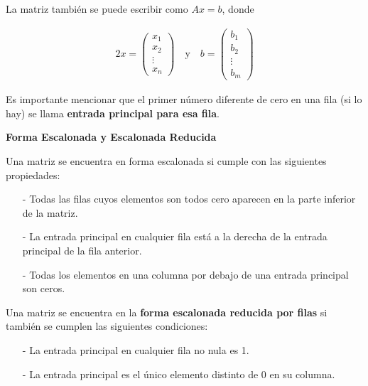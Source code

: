 \documentclass{article}
\begin{document}
\pagebreak

La matriz también se puede escribir como $Ax = b$, donde 

\begin{alignat*}{2}
    x= \begin{pmatrix}
        x_1\\
        x_2\\
        \vdots\\
        x_n
    \end{pmatrix} 
    \quad \text{y} \quad b = 
    \begin{pmatrix}
        b_1\\
        b_2\\
        \vdots\\
        b_m
    \end{pmatrix} 
\end{alignat*}

Es importante mencionar que el primer número diferente de cero en una fila (si lo hay) se llama \textbf{entrada principal para esa fila}. 

\begin{large}
    \textbf{Forma Escalonada y Escalonada Reducida}
\end{large}

Una matriz se encuentra en forma escalonada si cumple con las siguientes propiedades:

\begin{tcolorbox}[colback=blue!10!white,colframe=blue!60!black,title=Propiedades de la Forma Escalonada]
    \begin{itemize}
        \item[-] Todas las filas cuyos elementos son todos cero aparecen en la parte inferior de la matriz.
        \item[-] La entrada principal en cualquier fila está a la derecha de la entrada principal de la fila anterior.
        \item[-] Todas los elementos en una columna por debajo de una entrada principal son ceros.
    \end{itemize}   
    Una matriz se encuentra en la \textbf{forma escalonada reducida por filas} si también se cumplen las siguientes condiciones:
    \begin{itemize}
        \item[-] La entrada principal en cualquier fila no nula es 1.
        \item[-] La entrada principal es el único elemento distinto de 0 en su columna.
    \end{itemize}    
\end{tcolorbox}
\end{document}
